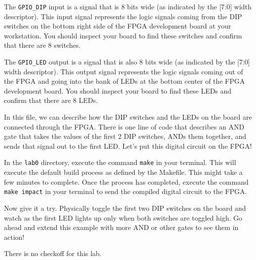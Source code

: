 \documentclass[11pt]{article}
\begin{document}
The \verb|GPIO_DIP| input is a signal that is 8 bits wide (as indicated by the [7:0] width descriptor). This input signal represents the logic signals coming from the DIP switches on the bottom right side of the FPGA development board at your workstation. You should inspect your board to find these switches and confirm that there are 8 switches.

The \verb|GPIO_LED| output is a signal that is also 8 bits wide (as indicated by the [7:0] width descriptor). This output signal represents the logic signals coming out of the FPGA and going into the bank of LEDs at the bottom center of the FPGA development board. You should inspect your board to find these LEDs and confirm that there are 8 LEDs.

In this file, we can describe how the DIP switches and the LEDs on the board are connected through the FPGA. There is one line of code that describes an AND gate that takes the values of the first 2 DIP switches, ANDs them together, and sends that signal out to the first LED. Let's put this digital circuit on the FPGA!

In the \verb|lab0| directory, execute the command \verb|make| in your terminal. This will execute the default build process as defined by the Makefile. This might take a few minutes to complete. Once the process has completed, execute the command \verb|make impact| in your terminal to send the compiled digital circuit to the FPGA.

Now give it a try. Physically toggle the first two DIP switches on the board and watch as the first LED lights up only when both switches are toggled high. Go ahead and extend this example with more AND or other gates to see them in action!

There is no checkoff for this lab.
\end{document}
